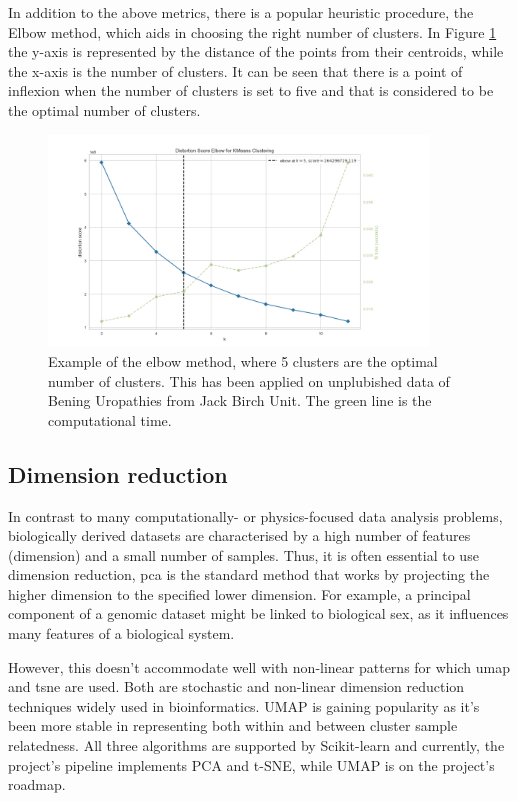 In addition to the above metrics, there is a popular heuristic procedure, the Elbow method, which aids in choosing the right number of clusters. In Figure \ref{fig:elbow_method} the y-axis is represented by the distance of the points from their centroids, while the x-axis is the number of clusters. It can be seen that there is a point of inflexion when the number of clusters is set to five and that is considered to be the optimal number of clusters.

\begin{figure}[!htb]
  \centering\includegraphics[width=0.9\textwidth,height=0.5\textheight,keepaspectratio]{Images/Clustering/elbow_method.png}
    \caption{Example of the elbow method, where 5 clusters are the optimal number of clusters. This has been applied on unplubished data of Bening Uropathies from Jack Birch Unit. The green line is the computational time. }
    \label{fig:elbow_method}
\end{figure}
\FloatBarrier


\subsection{Dimension reduction} \label{s:dim_red}

In contrast to many computationally- or physics-focused data analysis problems, biologically derived datasets are characterised by a high number of features (dimension) and a small number of samples. Thus, it is often essential to use dimension reduction, \acrfull{pca} is the standard method that works by projecting the higher dimension to the specified lower dimension. For example, a principal component of a genomic dataset might be linked to biological sex, as it influences many features of a biological system.

However, this doesn't accommodate well with non-linear patterns for which \acrfull{umap} and \acrfull{tsne} are used. Both are stochastic and non-linear dimension reduction techniques widely used in bioinformatics. UMAP is gaining popularity as it's been more stable in representing both within and between cluster sample relatedness. All three algorithms are supported by Scikit-learn and currently, the project's pipeline implements PCA and t-SNE, while UMAP is on the project's roadmap.

